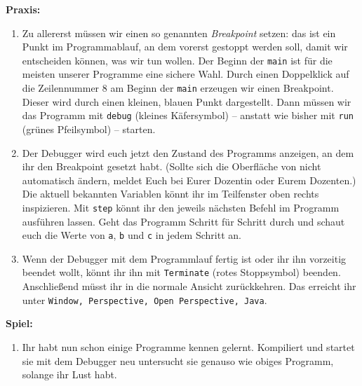 \textbf{Praxis:}
\begin{enumerate}
\item Zu allererst müssen wir einen so genannten \emph{Breakpoint} setzen: das
  ist ein Punkt im Programmablauf, an dem vorerst gestoppt werden soll, damit
  wir entscheiden können, was wir tun wollen. Der Beginn der \texttt{main} ist
  für die meisten unserer Programme eine sichere Wahl. Durch einen Doppelklick
  auf die Zeilennummer 8 am Beginn der \texttt{main} erzeugen wir einen
  Breakpoint. Dieser wird durch einen kleinen, blauen Punkt dargestellt. Dann
  müssen wir das Programm mit \texttt{debug} (kleines Käfersymbol) -- anstatt
  wie bisher mit \texttt{run} (grünes Pfeilsymbol) --
  starten. 
\item Der Debugger wird euch jetzt den Zustand des Programms anzeigen, an dem
  ihr den Breakpoint gesetzt habt. (Sollte sich die Oberfläche von \Eclipse
  nicht automatisch ändern, meldet Euch bei Eurer Dozentin oder Eurem Dozenten.)
  Die aktuell bekannten Variablen könnt ihr im Teilfenster oben rechts
  inspizieren.  Mit \texttt{step} könnt ihr den jeweils
  nächsten Befehl im Programm ausführen lassen. Geht das Programm Schritt für
  Schritt durch und schaut euch die Werte von \texttt{a}, \texttt{b}
  und \texttt{c} in jedem Schritt an.
\item Wenn der Debugger mit dem Programmlauf fertig ist oder ihr ihn vorzeitig
  beendet wollt, könnt ihr ihn mit \texttt{Terminate} (rotes Stoppsymbol)
  beenden. Anschließend müsst ihr in die normale \Java Ansicht zurückkehren. Das
  erreicht ihr unter \texttt{Window, Perspective, Open Perspective,
  Java}. 
\end{enumerate}

\textbf{Spiel:}
\begin{enumerate}
\item Ihr habt nun schon einige Programme kennen gelernt. Kompiliert und startet
  sie mit dem Debugger neu untersucht sie genauso wie obiges Programm, solange
  ihr Lust habt.
\end{enumerate}
